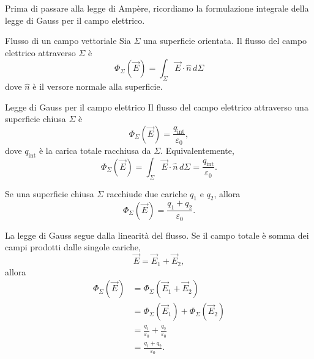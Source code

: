 \documentclass[a4paper]{article}
\begin{document}
Prima di passare alla legge di Ampère, ricordiamo la formulazione integrale della legge di Gauss per il campo elettrico.

\begin{snippetdefinition}{Flusso di un campo vettoriale}
    Sia \(\Sigma\) una superficie orientata. Il flusso del campo elettrico attraverso \(\Sigma\) è
    \[
        \Phi_\Sigma(\vec{E})=\int_\Sigma \vec{E}\cdot\hat{n}\,d\Sigma
    \]
    dove \(\hat{n}\) è il versore normale alla superficie.
\end{snippetdefinition}

\begin{snippettheorem}{Legge di Gauss per il campo elettrico}
    Il flusso del campo elettrico attraverso una superficie chiusa \(\Sigma\) è
    \[
        \Phi_\Sigma(\vec{E})=\frac{q_{\mathrm{int}}}{\varepsilon_0},
    \]
    dove \(q_{\mathrm{int}}\) è la carica totale racchiusa da \(
    \Sigma\).
    Equivalentemente,
    \[
        \Phi_\Sigma(\vec{E})=\int_\Sigma \vec{E}\cdot\hat{n}\,d\Sigma
        =\frac{q_{\mathrm{int}}}{\varepsilon_0}.
    \]
\end{snippettheorem}

Se una superficie chiusa \(\Sigma\) racchiude due cariche \(q_1\) e \(q_2\), allora
\[
    \Phi_\Sigma(\vec{E})=\frac{q_1+q_2}{\varepsilon_0}.
\]

\begin{center}
\end{center}

La legge di Gauss segue dalla linearità del flusso. Se il campo totale è somma dei campi prodotti dalle singole cariche,
\[
    \vec{E}=\vec{E}_1+\vec{E}_2,
\]
allora
\begin{align*}
    \Phi_\Sigma(\vec{E})
    &=\Phi_\Sigma(\vec{E}_1+\vec{E}_2) \\
    &=\Phi_\Sigma(\vec{E}_1)+\Phi_\Sigma(\vec{E}_2) \\
    &=\frac{q_1}{\varepsilon_0}+\frac{q_2}{\varepsilon_0} \\
    &=\frac{q_1+q_2}{\varepsilon_0}.
\end{align*}
\end{document}
